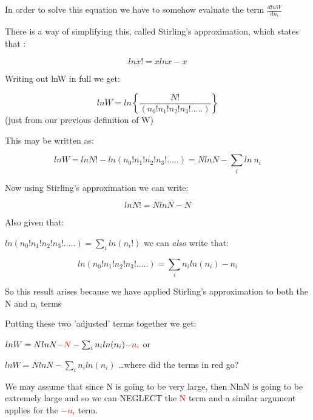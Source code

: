\documentclass[ignorenonframetext]{beamer}
\begin{document}
\begin{frame}[allowframebreaks=0.7]
In order to solve this equation we have to somehow evaluate the term 
\( \frac{dlnW}{dn_i}\)\par\medskip
 
There is a way of simplifying this, called Stirling's approximation, which states that :\par\medskip
 
\[lnx! = xlnx - x\]\par\medskip
 
Writing out lnW in full we get:\par\medskip
 
\[lnW   = ln\left\{\frac{N!}{(n_0!  n_1!  n_2!  n_3! …..)} \right\} \]  (just from our previous definition of W)

This may be written as:

\[lnW   = lnN! - ln(n_0!  n_1!  n_2!  n_3! …..) = NlnN - \sum_i ln\ n_i\] 
 
Now using Stirling's approximation we can write:
 
\[lnN! = NlnN - N\]
\end{frame}

\begin{frame}[allowframebreaks]
Also given that:\par\medskip
 
\(ln(n_0!  n_1!  n_2!  n_3! …..)      = \sum_i ln (n_i!)\) \hspace{1cm}        we can \textit{also} write that:\par
 
\[ln(n_0!  n_1!  n_2!  n_3! …..)      = \sum_i n_i ln(n_i)  - n_i   \]

So this result arises because we have applied Stirling's approximation to both the N and n\(_i\) terms\par\medskip
 
Putting these two 'adjusted’ terms together we get:\par\medskip

\(lnW = NlnN \textcolor{red}{- N}    - \sum_i n_i ln(n_i)  \textcolor{red}{- n_i}\)     \hspace{1cm} or\par\medskip
 
\(lnW = NlnN - \sum_i n_i ln(n_i)\) \hspace{0.5cm}  …where did the terms in red go?\par\medskip

We may assume that since N is going to be very large, then NlnN is going to be extremely large and so we can NEGLECT the \textcolor{red}{N} term and a similar argument applies for  the \textcolor{red}{\(-n_i\)}  term. 
\end{frame}
\end{document}
